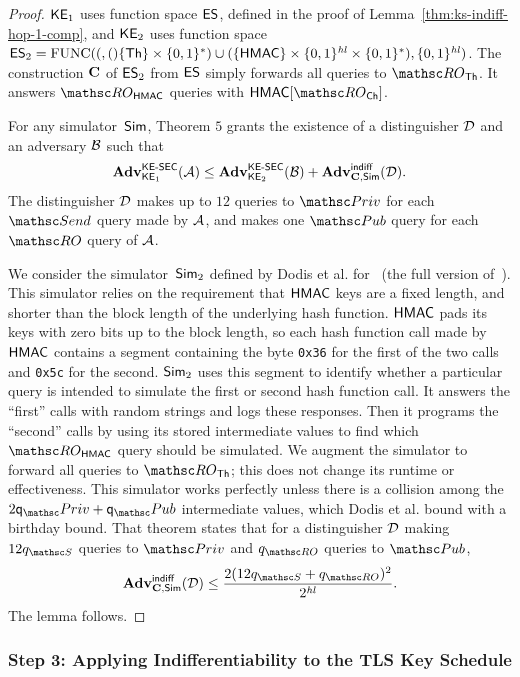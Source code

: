 \begin{proof}
	$\mathsf{KE}_1$ uses function space $\mathsf{ES}$, defined in the proof of Lemma~\ref{thm:ks-indiff-hop-1-comp}, and $\mathsf{KE}_2$ uses function space $\mathsf{ES}_2 = \mathrm{FUNC}((,()\{\mathsf{Th}\} \times \{0,1\}^*) \cup (\{\mathsf{HMAC}\} \times \{0,1\}^{\mathit{hl}} \times \{0,1\}^*), \{0,1\}^{\mathit{hl}})$.
	The construction $\mathbf{C}$ of $\mathsf{ES}_2$ from $\mathsf{ES}$ simply forwards all queries to $\ROthash$. It answers $\ROhmac$ queries with $\HMAC [\ROchash ]$.
	
	For any simulator~$\mathsf{Sim}$, Theorem $5$ grants the existence of a distinguisher $\mathcal{D}$ and an adversary $\mathcal{B}$ such that 
	\[ \mathbf{Adv}^{\mathrm{\mathsf{KE{\text{\normalfont-}}SEC}}}_{\mathsf{KE}_1}(\mathcal{A}) \leq \mathbf{Adv}^{\mathrm{\mathsf{KE{\text{\normalfont-}}SEC}}}_{\mathsf{KE}_2}(\mathcal{B}) + \mathbf{Adv}^{\mathrm{\mathsf{indiff}}}_{\mathbf{C},\mathsf{Sim}}(\mathcal{D}). \]
	The distinguisher $\mathcal{D}$ makes up to $12$ queries to $\PrivO$ for each $\Send$ query made by $\mathcal{A}$, and makes one $\PubO$ query for each $\RO$ query of $\mathcal{A}$. 
	
	We consider the simulator~$\mathsf{Sim}_2$ defined by Dodis et al. for~\cite[Theorem~4.3]{EPRINT:DRST13} (the full version of~\cite[Theorem~3]{C:DRST12}). 
	This simulator relies on the requirement that $\mathsf{HMAC}$ keys are a fixed length, and shorter than the block length of the underlying hash function.
	$\mathsf{HMAC}$ pads its keys with zero bits up to the block length, so each hash function call made by $\mathsf{HMAC}$ contains a segment containing the byte \texttt{0x36} for the first of the two calls and \texttt{0x5c} for the second.
	$\mathsf{Sim}_2$ uses this segment to identify whether a particular query is intended to simulate the first or second hash function call.
	It answers the ``first'' calls with random strings and logs these responses.
	Then it programs the ``second'' calls by using its stored intermediate values to find which $\ROhmac$ query should be simulated.
	We augment the simulator to forward all queries to $\ROthash$; this does not change its runtime or effectiveness.
	This simulator works perfectly unless there is a collision among the $2\qPriv+\qPub$ intermediate values, which Dodis et al. bound with a birthday bound.
	That theorem states that for a distinguisher $\mathcal{D}$ making $12\qSend$ queries to $\PrivO$ and $\qRO$ queries to $\PubO$, 
	\[ \genAdv{\indiff}{\construct{C}, \Sim}{\advD} \leq \frac{2(12\qSend+\qRO)^2}{2^{\hashlen}}. \]
	The lemma follows.
\end{proof}

\def\StepThreeTitle{Step 3: Applying Indifferentiability to the TLS Key Schedule}
\iffull
	\subsubsection{\StepThreeTitle}
\else
